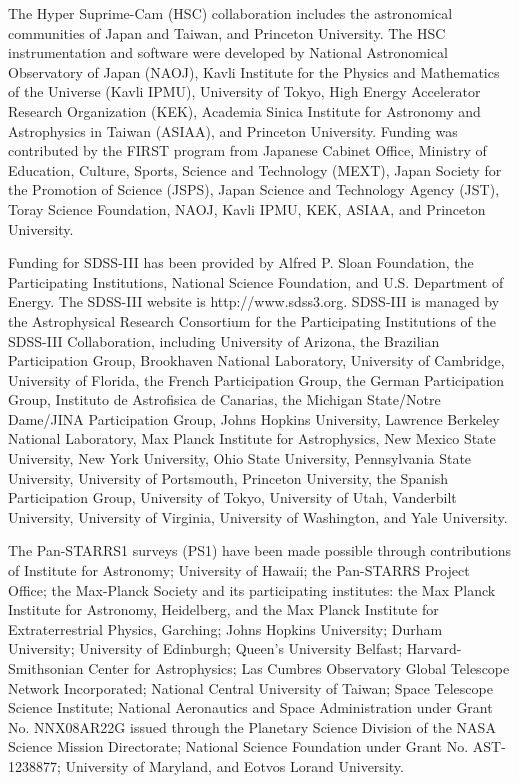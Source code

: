 \documentclass[a4paper,fleqn,usenatbib]{mnras}
\begin{document}
  The Hyper Suprime-Cam (HSC) collaboration includes the astronomical communities of 
  Japan and Taiwan, and Princeton University.  The HSC instrumentation and software were
  developed by National Astronomical Observatory of Japan (NAOJ), Kavli Institute
  for the Physics and Mathematics of the Universe (Kavli IPMU), University of Tokyo,
  High Energy Accelerator Research Organization (KEK), Academia Sinica Institute
  for Astronomy and Astrophysics in Taiwan (ASIAA), and Princeton University.  
  Funding was contributed by the FIRST program from Japanese Cabinet Office,  Ministry 
  of Education, Culture, Sports, Science and Technology (MEXT), Japan Society for 
  the Promotion of Science (JSPS), Japan Science and Technology Agency (JST), Toray 
  Science Foundation, NAOJ, Kavli IPMU, KEK, ASIAA, and Princeton University.
   
  Funding for SDSS-III has been provided by Alfred P. Sloan Foundation, the 
  Participating Institutions, National Science Foundation, and U.S. Department of
  Energy. The SDSS-III website is http://www.sdss3.org.  SDSS-III is managed by the
  Astrophysical Research Consortium for the Participating Institutions of the SDSS-III
  Collaboration, including University of Arizona, the Brazilian Participation Group,
  Brookhaven National Laboratory, University of Cambridge, University of Florida, the
  French Participation Group, the German Participation Group, Instituto de Astrofisica
  de Canarias, the Michigan State/Notre Dame/JINA Participation Group, Johns Hopkins
  University, Lawrence Berkeley National Laboratory, Max Planck Institute for
  Astrophysics, New Mexico State University, New York University, Ohio State University,
  Pennsylvania State University, University of Portsmouth, Princeton University, the
  Spanish Participation Group, University of Tokyo, University of Utah, Vanderbilt
  University, University of Virginia, University of Washington, and Yale University.
  
  The Pan-STARRS1 surveys (PS1) have been made possible through contributions of  
  Institute for Astronomy; University of Hawaii; the Pan-STARRS Project Office; 
  the Max-Planck Society and its participating institutes: the Max Planck Institute 
  for Astronomy, Heidelberg, and the Max Planck Institute for Extraterrestrial Physics, 
  Garching; Johns Hopkins University; Durham University; University of Edinburgh; 
  Queen's University Belfast; Harvard-Smithsonian Center for Astrophysics; Las 
  Cumbres Observatory Global Telescope Network Incorporated; National Central 
  University of Taiwan; Space Telescope Science Institute; National Aeronautics 
  and Space Administration under Grant No. NNX08AR22G issued through the Planetary 
  Science Division of the NASA Science Mission Directorate; National Science 
  Foundation under Grant No. AST-1238877; University of Maryland, and Eotvos 
  Lorand University. 
  
\end{document}
